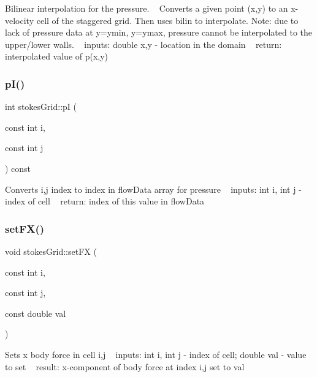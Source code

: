 Bilinear interpolation for the pressure. ~\newline
Converts a given point (x,y) to an x-\/velocity cell of the staggered grid. Then uses bilin to interpolate. Note\+: due to lack of pressure data at y=ymin, y=ymax, pressure cannot be interpolated to the upper/lower walls. ~\newline
inputs\+: double x,y -\/ location in the domain ~\newline
return\+: interpolated value of p(x,y) ~\newline
\mbox{\label{classstokesGrid_a1219f8545755d880183f5beeba5a0e1a}} 
\subsubsection{\texorpdfstring{p\+I()}{pI()}}
{\footnotesize\ttfamily int stokes\+Grid\+::pI (\begin{DoxyParamCaption}\item[{const int}]{i,  }\item[{const int}]{j }\end{DoxyParamCaption}) const}

Converts i,j index to index in flow\+Data array for pressure ~\newline
inputs\+: int i, int j -\/ index of cell ~\newline
return\+: index of this value in flow\+Data \mbox{\label{classstokesGrid_a87a1387d4f623cda7c26aed5454895af}} 
\subsubsection{\texorpdfstring{set\+F\+X()}{setFX()}}
{\footnotesize\ttfamily void stokes\+Grid\+::set\+FX (\begin{DoxyParamCaption}\item[{const int}]{i,  }\item[{const int}]{j,  }\item[{const double}]{val }\end{DoxyParamCaption})}

Sets x body force in cell i,j ~\newline
inputs\+: int i, int j -\/ index of cell; double val -\/ value to set ~\newline
result\+: x-\/component of body force at index i,j set to val \mbox{\label{classstokesGrid_ad86344e194c01329a8c38e569fc8f7cd}} 
